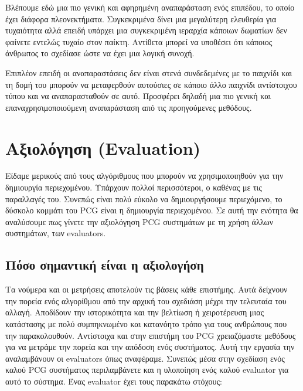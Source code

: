 \par
Βλέπουμε εδώ μια πιο γενική και αφηρημένη αναπαράσταση ενός επιπέδου, το οποίο έχει διάφορα πλεονεκτήματα. Συγκεκριμένα δίνει μια μεγαλύτερη ελευθερία για τυχαιότητα αλλά επειδή υπάρχει μια συγκεκριμένη ιεραρχία κάποιων δωματίων δεν φαίνετε εντελώς τυχαίο στον παίκτη. Αντίθετα μπορεί να υποθέσει ότι κάποιος άνθρωπος το σχεδίασε ώστε να έχει μια λογική συνοχή.
\par
Επιπλέον επειδή οι αναπαραστάσεις δεν είναι στενά συνδεδεμένες με το παιχνίδι και τη δομή του μπορούν να μεταφερθούν αυτούσιες σε κάποιο άλλο παιχνίδι αντίστοιχου τύπου και να αναπαρασταθούν σε αυτό. Προσφέρει δηλαδή μια πιο γενική και επαναχρησιμοποιούμενη αναπαράσταση από τις προηγούμενες μεθόδους.


\section{Αξιολόγηση (Evaluation)}
Είδαμε μερικούς από τους αλγόριθμους που μπορούν να χρησιμοποιηθούν για την δημιουργία περιεχομένου. Υπάρχουν πολλοί περισσότεροι, ο καθένας με τις παραλλαγές του. Συνεπώς είναι πολύ εύκολο να δημιουργήσουμε περιεχόμενο, το δύσκολο κομμάτι του PCG είναι η δημιουργία  περιεχομένου. Σε αυτή την ενότητα θα αναλύσουμε πως γίνετε την αξιολόγηση PCG συστημάτων με τη χρήση άλλων συστημάτων, των evaluators.

\subsection{Πόσο σημαντική είναι η αξιολογήση}
Τα νούμερα και οι μετρήσεις αποτελούν τις βάσεις κάθε επιστήμης. Αυτά δείχνουν την πορεία ενός αλγορίθμου από την αρχική του σχεδιάση μέχρι την τελευταία του αλλαγή. Αποδίδουν την ιστορικότητα και την βελτίωση ή χειροτέρευση μιας κατάστασης με πολύ συμπηκνωμένο και κατανόητο τρόπο για τους ανθρώπους που την παρακολουθούν. Αντίστοιχα και στην επιστήμη του PCG χρειαζόμαστε μεθόδους για να μετράμε την πορεία και την απόδοση ενός συστήματος. Αυτή την εργασία την αναλαμβάνουν οι evaluators όπως αναφέραμε. Συνεπώς μέσα στην σχεδίαση ενός καλού PCG συστήματος περιλαμβάνετε και η υλοποίηση ενός καλού evaluator για αυτό το σύστημα. Ένας evaluator έχει τους παρακάτω στόχους:


